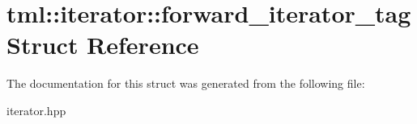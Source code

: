 \hypertarget{structtml_1_1iterator_1_1forward__iterator__tag}{\section{tml\+:\+:iterator\+:\+:forward\+\_\+iterator\+\_\+tag Struct Reference}
\label{structtml_1_1iterator_1_1forward__iterator__tag}
}


The documentation for this struct was generated from the following file\+:\begin{DoxyCompactItemize}
\item 
iterator.\+hpp\end{DoxyCompactItemize}
